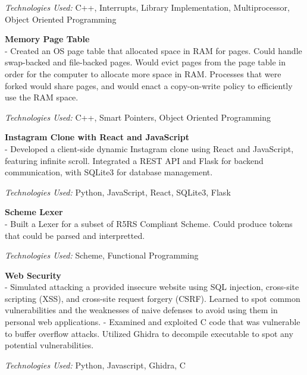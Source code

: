 \documentclass[9pt]{extarticle}
\begin{document}
\textit{Technologies Used:} C++, Interrupts, Library Implementation, Multiprocessor, Object Oriented Programming


\noindent \textbf{Memory Page Table}\\
- Created an OS page table that allocated space in RAM for pages. Could handle swap-backed and file-backed pages.
Would evict pages from the page table in order for the computer to allocate more space in RAM.
Processes that were forked would share pages, and would enact a copy-on-write policy to efficiently use the RAM space.

\textit{Technologies Used:} C++, Smart Pointers, Object Oriented Programming

\noindent \textbf{Instagram Clone with React and JavaScript} \\
- Developed a client-side dynamic Instagram clone using React and JavaScript,
featuring infinite scroll. Integrated a REST API and Flask for backend communication,
with SQLite3 for database management.

\textit{Technologies Used:} Python, JavaScript, React, SQLite3, Flask

\noindent \textbf{Scheme Lexer} \\
- Built a Lexer for a subset of R5RS Compliant Scheme. Could produce tokens that could be parsed and interpretted.

\textit{Technologies Used:} Scheme, Functional Programming

\noindent \textbf{Web Security} \\
- Simulated attacking a provided insecure website using SQL
injection, cross-site scripting (XSS), and cross-site request forgery
(CSRF). Learned to spot common vulnerabilities and the
weaknesses of naive defenses to avoid using them in personal web
applications.
- Examined and exploited C code that was vulnerable to buffer overflow attacks. Utilized Ghidra to
decompile executable to spot any potential vulnerabilities.

\textit{Technologies Used:} Python, Javascript, Ghidra, C
\end{document}
